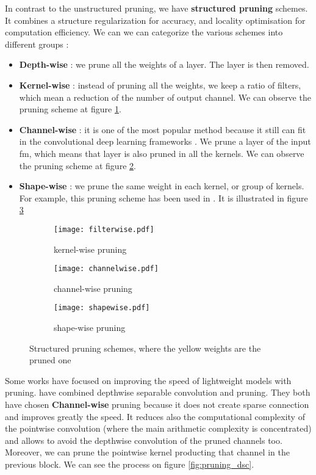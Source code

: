 In contrast to the unstructured pruning, we have \textbf{structured pruning} schemes. It combines a structure regularization for accuracy, and locality optimisation for computation efficiency. We can we can categorize the various schemes into different groups \cite{wen_learning_2016, cheng_recent_2018}:
\begin{itemize}
    \item \textbf{Depth-wise} : we prune all the weights of a layer. The layer is then removed.
    \item \textbf{Kernel-wise} : instead of pruning all the weights, we keep a ratio of filters, which mean a reduction of the number of output channel. We can observe the pruning scheme at figure \ref{fig:struct_pruning:fw}.
    \item \textbf{Channel-wise} : it is one of the most popular method because it still can fit in the convolutional deep learning frameworks \cite{liu_rethinking_2019}. We prune a layer of the input \acrshort{fm}, which means that layer is also pruned in all the kernels. We can observe the pruning scheme at figure \ref{fig:struct_pruning:chw}.
    \item \textbf{Shape-wise} : we prune the same weight in each kernel, or group of kernels. For example, this pruning scheme has been used in \textcite{zhu_efficient_2020}. It is illustrated in figure \ref{fig:struct_pruning:sw}
\end{itemize}
%
\begin{figure}
    \centering
    \begin{subfigure}{.32\textwidth}
    \centering
    \texttt{[image: filterwise.pdf]}
    \caption{kernel-wise pruning}
    \label{fig:struct_pruning:fw}
    \end{subfigure}
    \begin{subfigure}{.32\textwidth}
    \centering
    \texttt{[image: channelwise.pdf]}
    \caption{channel-wise pruning}
    \label{fig:struct_pruning:chw}
    \end{subfigure}
    \begin{subfigure}{.32\textwidth}
    \centering
    \texttt{[image: shapewise.pdf]}
    \caption{shape-wise pruning}
    \label{fig:struct_pruning:sw}
    \end{subfigure}
    \caption{Structured pruning schemes, where the yellow weights are the pruned one}
    \label{fig:struct_pruning}
\end{figure}
%
Some works have focused on improving the speed of lightweight models with pruning. \textcite{zhang_channel_2019, tu_pruning_2019} have combined depthwise separable convolution and pruning. They both have chosen \textbf{Channel-wise} pruning because it does not create sparse connection and improves greatly the speed. It reduces also the computational complexity of the pointwise convolution (where the main arithmetic complexity is concentrated) and allows to avoid the depthwise convolution of the pruned channels too. Moreover, we can prune the pointwise kernel producting that channel in the previous block. We can see the process on figure \ref{fig:pruning_dsc}. 
